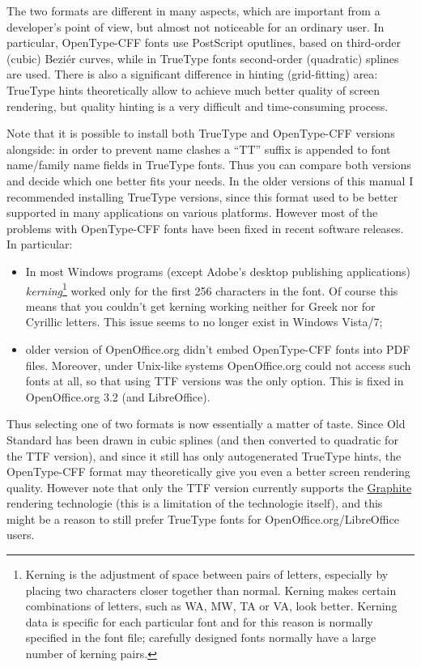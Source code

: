 \documentclass[12pt,a4paper,openany]{book}
\begin{document}
The two formats are different in many aspects, which are important
from a developer's point of view, but almost not noticeable for an ordinary
user. In particular, OpenType-CFF fonts use PostScript oputlines, based
on third-order (cubic) Beziér curves, while in TrueType fonts second-order
(quadratic) splines are used. There is also a significant difference in
hinting (grid-fitting) area: TrueType hints theoretically allow to
achieve much better quality of screen rendering, but quality hinting is a
very difficult and time-consuming process.

Note that it is possible to install both TrueType and OpenType-CFF versions
alongside: in order to prevent name clashes a “TT” suffix is appended to
font name/family name fields in TrueType fonts. Thus you can compare both
versions and decide which one better fits your needs. In the older versions
of this manual I recommended installing TrueType versions, since this
format used to be better supported in many applications on various
platforms. However most of the problems with OpenType-CFF fonts have been
fixed in recent software releases. In particular:

\begin{itemize}

\item In most Windows programs (except Adobe's desktop publishing applications)
\textit{kerning}\footnote{Kerning is the adjustment of space between pairs
of letters, especially by placing two characters closer together than
normal. Kerning makes certain combinations of letters, such as WA, MW,
TA or VA, look better. Kerning data is specific for each particular font
and for this reason is normally specified in the font file; carefully
designed fonts normally have a large number of kerning pairs.} worked
only for the first 256 characters in the font. Of course this means that
you couldn't get kerning working neither for Greek nor for Cyrillic
letters. This issue seems to no longer exist in Windows Vista/7;

\item older version of OpenOffice.org didn't embed OpenType-CFF fonts into PDF
files. Moreover, under Unix-like systems OpenOffice.org could not access
such fonts at all, so that using TTF versions was the only option. This
is fixed in OpenOffice.org 3.2 (and LibreOffice).

\end{itemize}

Thus selecting one of two formats is now essentially a matter of taste.
Since Old Standard has been drawn in cubic splines (and then converted to
quadratic for the TTF version), and since it still has only autogenerated
TrueType hints, the OpenType-CFF format may theoretically give you even
a better screen rendering quality. However note that only the
TTF version currently supports the \hyperlink{Graphite}{Graphite}
rendering technologie (this is a limitation of the technologie itself),
and this might be a reason to still prefer TrueType fonts for
OpenOffice.org/LibreOffice users.
\end{document}
